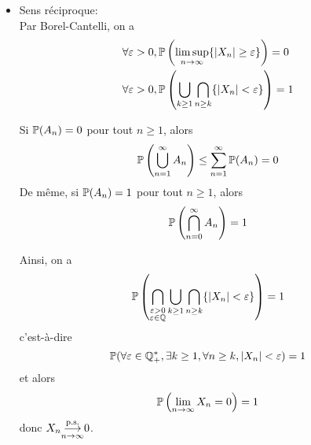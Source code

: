 {\begin{td-sol}[]
\begin{enumerate}
\begin{itemize}[\ptr{}]
                \item Sens réciproque:\\
                Par Borel-Cantelli, on a
                \begin{equation*}
                    \begin{aligned}
                        & \forall\varepsilon>0,\mathbb{P}\left(\limsup_{n\to\infty}\{|X_n|\geq\varepsilon\}\right) = 0\\
                        & \forall\varepsilon>0,\mathbb{P}\left(\bigcup_{k\geq 1}\bigcap_{n\geq k}\{|X_n|<\varepsilon\}\right) = 1
                    \end{aligned}
                \end{equation*}
                \begin{remark}
                    Si \(\mathbb{P}(A_n)=0\) pour tout \(n\geq 1\), alors
                    \begin{equation*}
                        \mathbb{P}\left(\bigcup_{n=1}^\infty A_n\right) \leq \sum_{n=1}^\infty \mathbb{P}(A_n)=0
                    \end{equation*}
                    De même, si \(\mathbb{P}(A_n)=1\) pour tout \(n\geq 1\), alors
                    \begin{equation*}
                        \mathbb{P}\left(\bigcap_{n=0}^\infty A_n\right)=1
                    \end{equation*}
                \end{remark}
                Ainsi, on a
                \begin{equation*}
                    \mathbb{P}\left(\bigcap_{\substack{\varepsilon>0\\\varepsilon\in\mathbb{Q}}}\bigcup_{k\geq 1}\bigcap_{n\geq k}\{|X_n|<\varepsilon\}\right)=1
                \end{equation*}
                c'est-à-dire
                \begin{equation*}
                    \mathbb{P}(\forall\varepsilon\in\mathbb{Q}_+^*,\exists k\geq 1,\forall n\geq k,|X_n|<\varepsilon)=1
                \end{equation*}
                et alors
                \begin{equation*}
                    \mathbb{P}\left(\lim_{n\to\infty}X_n=0\right)=1
                \end{equation*}
                donc \(X_n\underset{n\to\infty}{{\overset{\text{p.s.}}{\longrightarrow}}} 0\).
            \end{itemize}


\end{enumerate}
\end{td-sol}}
